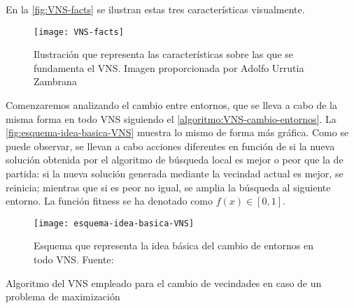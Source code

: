 En la \autoref{fig:VNS-facts} se ilustran estas tres características visualmente.

\begin{figure}
	\centering
	\texttt{[image: VNS-facts]}
	\caption[Ilustración que representa las características sobre las que se fundamenta el VNS]{Ilustración que representa las características sobre las que se fundamenta el VNS. Imagen proporcionada por Adolfo Urrutia Zambrana}
	\label{fig:VNS-facts}
\end{figure}

Comenzaremos analizando el cambio entre entornos, que se lleva a cabo de la misma forma en todo VNS siguiendo el \autoref{algoritmo:VNS-cambio-entornos}. La \autoref{fig:esquema-idea-basica-VNS} muestra lo mismo de forma más gráfica.
Como se puede observar, se llevan a cabo acciones diferentes en función de si la nueva solución obtenida por el algoritmo de búsqueda local es mejor o peor que la de partida: si la nueva solución generada mediante la vecindad actual es mejor, se reinicia; mientras que si es peor no igual, se amplia la búsqueda al siguiente entorno. La función fitness se ha denotado como $f(x) \in [0,1]$.

\begin{figure}
	\centering
	\texttt{[image: esquema-idea-basica-VNS]}
	\caption[Esquema que representa la idea básica del cambio de entornos en todo VNS]{Esquema que representa la idea básica del cambio de entornos en todo VNS. Fuente:~\cite{sota:metaheuristicas-design-impl}}
	\label{fig:esquema-idea-basica-VNS}
\end{figure}

\begin{algorithm}[htbp]
	\caption{Algoritmo del VNS empleado para el cambio de vecindades en caso de un problema de maximización}
	\label{algoritmo:VNS-cambio-entornos}

	\DontPrintSemicolon
	\medskip

\end{algorithm}

